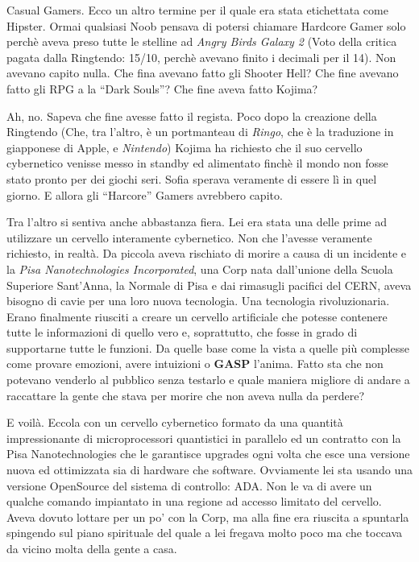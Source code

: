     Casual Gamers. Ecco un altro termine per il quale era stata etichettata
    come Hipster. Ormai qualsiasi Noob pensava di potersi chiamare Hardcore
    Gamer solo perchè aveva preso tutte le stelline ad \emph{Angry Birds
    Galaxy 2} (Voto della critica pagata dalla Ringtendo: 15/10, perchè
    avevano finito i decimali per il 14). Non avevano capito nulla. Che
    fina avevano fatto gli Shooter Hell? Che fine avevano fatto gli RPG
    a la ``Dark Souls''? Che fine aveva fatto Kojima?

    Ah, no. Sapeva che fine avesse fatto il regista. Poco dopo la creazione
    della Ringtendo (Che, tra l'altro, è un portmanteau di \emph{Ringo},
    che è la traduzione in giapponese di Apple, e \emph{Nintendo}) Kojima
    ha richiesto che il suo cervello cybernetico venisse messo in standby
    ed alimentato finchè il mondo non fosse stato pronto per dei giochi
    seri. Sofia sperava veramente di essere lì in quel giorno. E allora gli
    ``Harcore'' Gamers avrebbero capito.

    Tra l'altro si sentiva anche abbastanza fiera. Lei era stata una delle
    prime ad utilizzare un cervello interamente cybernetico. Non che
    l'avesse veramente richiesto, in realtà. Da piccola aveva rischiato di
    morire a causa di un incidente e la \emph{Pisa Nanotechnologies
    Incorporated}, una Corp nata dall'unione della Scuola Superiore
    Sant'Anna, la Normale di Pisa e dai rimasugli pacifici del CERN, aveva
    bisogno di cavie per una loro nuova tecnologia. Una tecnologia
    rivoluzionaria. Erano finalmente riusciti a creare un cervello
    artificiale che potesse contenere tutte le informazioni di quello vero
    e, soprattutto, che fosse in grado di supportarne tutte le funzioni. Da
    quelle base come la vista a quelle più complesse come provare emozioni,
    avere intuizioni o \textbf{GASP} l'anima. Fatto sta che non potevano
    venderlo al pubblico senza testarlo e quale maniera migliore di andare
    a raccattare la gente che stava per morire che non aveva nulla da
    perdere?

    E voilà. Eccola con un cervello cybernetico formato da una quantità
    impressionante di microprocessori quantistici in parallelo ed un
    contratto con la Pisa Nanotechnologies che le garantisce upgrades
    ogni volta che esce una versione nuova ed ottimizzata sia di hardware
    che software. Ovviamente lei sta usando una versione OpenSource del
    sistema di controllo: ADA. Non le va di avere un qualche comando impiantato
    in una regione ad accesso limitato del cervello. Aveva dovuto lottare
    per un po' con la Corp, ma alla fine era riuscita a spuntarla spingendo
    sul piano spirituale del quale a lei fregava molto poco ma che toccava
    da vicino molta della gente a casa.

